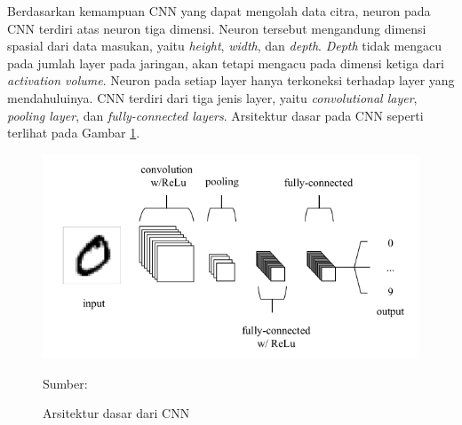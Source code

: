 Berdasarkan kemampuan CNN yang dapat mengolah data citra, neuron pada CNN terdiri atas neuron tiga dimensi. Neuron tersebut mengandung dimensi spasial dari data masukan, yaitu \textit{height}, \textit{width}, dan \textit{depth}. \textit{Depth} tidak mengacu pada jumlah layer pada jaringan, akan tetapi mengacu pada dimensi ketiga dari \textit{activation volume}. Neuron pada setiap layer hanya terkoneksi terhadap layer yang mendahuluinya. CNN terdiri dari tiga jenis layer, yaitu \textit{convolutional layer}, \textit{pooling layer}, dan \textit{fully-connected layers}. Arsitektur dasar pada CNN seperti terlihat pada Gambar \ref{fig:cnn}.

\begin{figure}[H]
    \begin{center}
        \includegraphics[width=12cm]{../img/CNN Basic - Latex.png}
        \caption{Arsitektur dasar dari CNN}
        \label{fig:cnn}
        Sumber: \citep{OShea2015}
    \end{center}
\end{figure}

